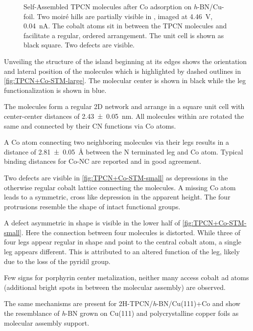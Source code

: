 \begin{figure}[!h]
{		\label{fig:TPCN+Co-STM-small-model}
	}
	\caption{Self-Assembled TPCN molecules after Co adsorption on \textit{h}-BN/Cu-foil. Two moir\'e hills are partially visible in , imaged at \SI{4.46}{\volt}, \SI{0.04}{\nano\ampere}.  The cobalt atoms sit in between the TPCN molecules and facilitate a regular, ordered arrangement. The unit cell is shown as black square. Two defects are visible.}%
	\label{fig:TPCN+Co-STM}%
\end{figure}%

Unveiling the structure of the island beginning at its edges shows the orientation and lateral position of the molecules which is highlighted by dashed outlines in \ref{fig:TPCN+Co-STM-large}. The molecular center is shown in black while the leg functionalization is shown in blue.

The molecules form a regular 2D network and arrange in a square unit cell with center-center distances of \SI{2.43 \pm 0.05}{\nano \meter}. All molecules within are rotated the same and connected by their CN functions via Co atoms. 

A Co atom connecting two neighboring molecules via their legs results in a distance of \SI{2.81 \pm 0.05}{\angstrom} between the N terminated leg and Co atom. Typical binding distances for Co-NC are reported \cite{schlickum_metalorganic_2007, przychodzen_supramolecular_2006} and in good agreement.

Two defects are visible in \autoref{fig:TPCN+Co-STM-small} as depressions in the otherwise regular cobalt lattice connecting the molecules. A missing Co atom leads to a symmetric, cross like depression in the apparent height. The four protrusions resemble the shape of intact functional groups.

A defect asymmetric in shape is visible in the lower half of \autoref{fig:TPCN+Co-STM-small}. Here the connection between four molecules is distorted. While three of four legs appear regular in shape and point to the central cobalt atom, a single leg appears different. This is attributed to an altered function of the leg, likely due to the loss of the pyridil group.

Few signs for porphyrin center metalization, neither many access cobalt ad atoms (additional bright spots in between the molecular assembly) are observed. 

The same mechanisms are present for 2H-TPCN/\textit{h}-BN/Cu(111)+Co \cite{urgel_controlling_2015} and show the resemblance of \textit{h}-BN grown on Cu(111) and polycrystalline copper foils as molecular assembly support.

